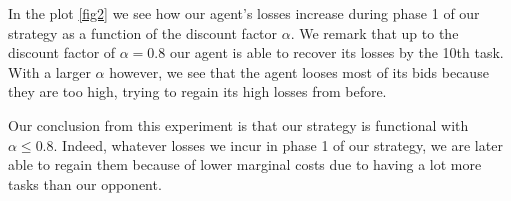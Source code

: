 \documentclass[11pt]{article}
\begin{document}
  In the plot \ref{fig2} we see how our agent's losses increase during phase 1 of our
  strategy as a function of the discount factor $\alpha$. We remark that up to
  the discount factor of $\alpha = 0.8$ our agent is able to recover its losses
  by the 10th task. With a larger $\alpha$ however, we see that the agent looses
  most of its bids because they are too high, trying to regain its high losses
  from before. 
  
  Our conclusion from this experiment is that our strategy is
  functional with $\alpha \leq 0.8$. Indeed, whatever losses we incur in phase 1
  of our strategy, we are later able to regain them because of lower marginal
  costs due to having a lot more tasks than our opponent.
\end{document}

